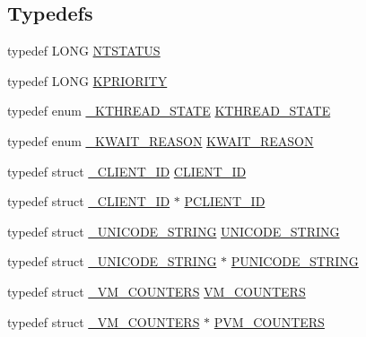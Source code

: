 \subsection*{Typedefs}
\begin{DoxyCompactItemize}
\item 
typedef L\-O\-N\-G \hyperlink{ntdll_8h_a77a2f6628aaa056315f8c8ad2c466fdc}{N\-T\-S\-T\-A\-T\-U\-S}
\item 
typedef L\-O\-N\-G \hyperlink{ntdll_8h_ade7f74903369701780e5940b2d929167}{K\-P\-R\-I\-O\-R\-I\-T\-Y}
\item 
typedef enum \hyperlink{ntdll_8h_a89cf35e06b66523904596d9dbdd93af4}{\-\_\-\-K\-T\-H\-R\-E\-A\-D\-\_\-\-S\-T\-A\-T\-E} \hyperlink{ntdll_8h_a1777c735cde3f8f24e73e01ebb4c4bd9}{K\-T\-H\-R\-E\-A\-D\-\_\-\-S\-T\-A\-T\-E}
\item 
typedef enum \hyperlink{ntdll_8h_a32f8868bc010efa7da787526013b93fb}{\-\_\-\-K\-W\-A\-I\-T\-\_\-\-R\-E\-A\-S\-O\-N} \hyperlink{ntdll_8h_a13049b283e815004e7114b280c287376}{K\-W\-A\-I\-T\-\_\-\-R\-E\-A\-S\-O\-N}
\item 
typedef struct \hyperlink{struct___c_l_i_e_n_t___i_d}{\-\_\-\-C\-L\-I\-E\-N\-T\-\_\-\-I\-D} \hyperlink{ntdll_8h_a84b8c09135ebbc3f50857e14c3823c39}{C\-L\-I\-E\-N\-T\-\_\-\-I\-D}
\item 
typedef struct \hyperlink{struct___c_l_i_e_n_t___i_d}{\-\_\-\-C\-L\-I\-E\-N\-T\-\_\-\-I\-D} $\ast$ \hyperlink{ntdll_8h_af4a8336b9d73c09d52442844aea25b75}{P\-C\-L\-I\-E\-N\-T\-\_\-\-I\-D}
\item 
typedef struct \hyperlink{struct___u_n_i_c_o_d_e___s_t_r_i_n_g}{\-\_\-\-U\-N\-I\-C\-O\-D\-E\-\_\-\-S\-T\-R\-I\-N\-G} \hyperlink{ntdll_8h_afb1771465aaa5d77efedcfc1a3a43dfb}{U\-N\-I\-C\-O\-D\-E\-\_\-\-S\-T\-R\-I\-N\-G}
\item 
typedef struct \hyperlink{struct___u_n_i_c_o_d_e___s_t_r_i_n_g}{\-\_\-\-U\-N\-I\-C\-O\-D\-E\-\_\-\-S\-T\-R\-I\-N\-G} $\ast$ \hyperlink{ntdll_8h_a9d9596239ae6918bf1780d06c3124e8b}{P\-U\-N\-I\-C\-O\-D\-E\-\_\-\-S\-T\-R\-I\-N\-G}
\item 
typedef struct \hyperlink{struct___v_m___c_o_u_n_t_e_r_s}{\-\_\-\-V\-M\-\_\-\-C\-O\-U\-N\-T\-E\-R\-S} \hyperlink{ntdll_8h_aa97dd8030df9ac9a6e6a71ba2819f19b}{V\-M\-\_\-\-C\-O\-U\-N\-T\-E\-R\-S}
\item 
typedef struct \hyperlink{struct___v_m___c_o_u_n_t_e_r_s}{\-\_\-\-V\-M\-\_\-\-C\-O\-U\-N\-T\-E\-R\-S} $\ast$ \hyperlink{ntdll_8h_aa8b45a9e44cb284384d22cf7c8ae94c4}{P\-V\-M\-\_\-\-C\-O\-U\-N\-T\-E\-R\-S}
\end{DoxyCompactItemize}
